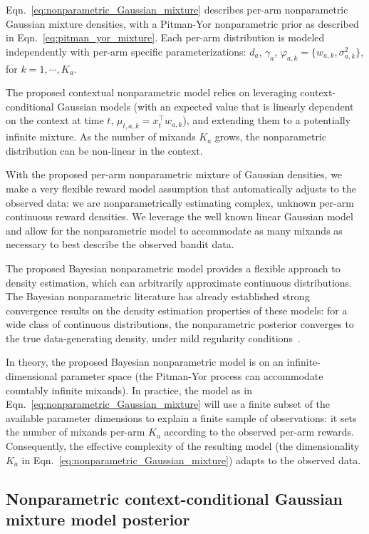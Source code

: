 Eqn.~\eqref{eq:nonparametric_Gaussian_mixture} describes per-arm nonparametric Gaussian mixture densities, with a Pitman-Yor nonparametric prior as described in Eqn.~\eqref{eq:pitman_yor_mixture}.
Each per-arm distribution is modeled independently with per-arm specific parameterizations: $d_a$, $\gamma_a$, $\varphi_{a,k}=\{w_{a,k}, \sigma_{a,k}^2 \}$, for $k={1,\cdots, K_a}$. 

The proposed contextual nonparametric model relies on leveraging context-conditional Gaussian models (with an expected value that is linearly dependent on the context at time $t$, \ie $\mu_{t,a,k}=x_t^\top w_{a,k}$), and extending them to a potentially infinite mixture.
As the number of mixands $K_a$ grows, the nonparametric distribution can be non-linear in the context.

With the proposed per-arm nonparametric mixture of Gaussian densities, we make a very flexible reward model assumption that automatically adjusts to the observed data: we are nonparametrically estimating complex, unknown per-arm continuous reward densities.
We leverage the well known linear Gaussian model and allow for the nonparametric model to accommodate as many mixands as necessary to best describe the observed bandit data.

The proposed Bayesian nonparametric model provides a flexible approach to density estimation, which can arbitrarily approximate continuous distributions. 
The Bayesian nonparametric literature has already established strong convergence results on the density estimation properties of these models: for a wide class of continuous distributions, the nonparametric posterior converges to the true data-generating density, under mild regularity conditions~\citep{j-Ghosal1999, j-Lijoi2004, j-Tokdar2006, j-Ghosal2007, j-Bhattacharya2010, j-Pati2013}.

In theory, the proposed Bayesian nonparametric model is on an infinite-dimensional parameter space (\ie the Pitman-Yor process can accommodate countably infinite mixands).
In practice, the model as in Eqn.~\eqref{eq:nonparametric_Gaussian_mixture} will use a finite subset of the available parameter dimensions to explain a finite sample of observations: \ie it sets the number of mixands per-arm $K_a$ according to the observed per-arm rewards.
Consequently, the effective complexity of the resulting model (\ie the dimensionality $K_a$ in Eqn.~\eqref{eq:nonparametric_Gaussian_mixture}) adapts to the observed data.

\subsection{Nonparametric context-conditional Gaussian mixture model posterior}
\label{ssec:nonparametric_posterior_update}


